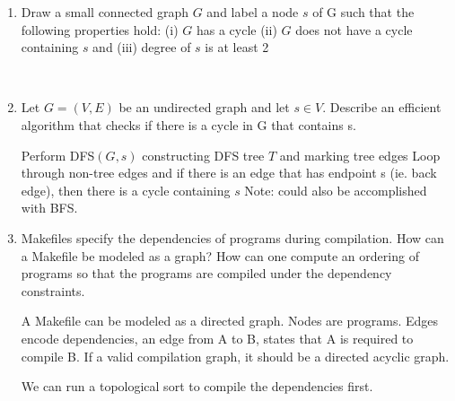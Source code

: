 \documentclass[fleqn]{article}
\begin{document}
\begin{enumerate}
    \item Draw a small connected graph $G$ and label a node $s$ of G such that the following properties hold: (i) $G$ has a cycle (ii) $G$ does not have a cycle containing $s$ and (iii) degree of $s$ is at least 2
    \begin{answer} \\
    \end{answer}

    \item Let $G = (V, E)$ be an undirected graph and let $s \in V$. Describe an efficient algorithm that checks if there is a cycle in G that contains s.
    \begin{answer}
    Perform DFS$(G, s)$ constructing DFS tree $T$ and marking tree edges
    Loop through non-tree edges and if there is an edge that has endpoint s (ie. back edge), then there is a cycle containing $s$
    Note: could also be accomplished with BFS.
    \end{answer}

    \item Makefiles specify the dependencies of programs during compilation. How can a Makefile be modeled as a graph? How can one compute an ordering of programs so that the programs are compiled under the dependency constraints.
    \begin{answer}
    A Makefile can be modeled as a directed graph. Nodes are programs. Edges encode dependencies, an edge from A to B, states that A is required to compile B. If a valid compilation graph, it should be a directed acyclic graph.
    
    We can run a topological sort to compile the dependencies first.
    \end{answer}


\end{enumerate}
\end{document}
